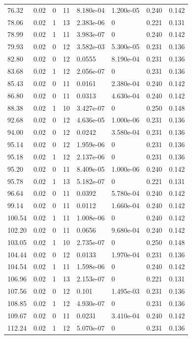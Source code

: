 \documentclass[preview]{standalone}
\begin{document}
{{{\begin{tabular}{L{1.2cm}C{1.2cm} C{0.3cm}C{0.5cm} C{1.4cm}C{1.4cm} C{1.4cm}C{1.4cm}}
  76.32  &  0.02  & 0     & 11 &  8.180e-04  & 1.200e-05  & 0.240 &  0.142   \\ 
  78.06  &  0.02  & 1     & 13 &  2.383e-06  & 0  & 0.221 &  0.131   \\ 
  78.99  &  0.02  & 1     & 11 &  3.983e-07  & 0  & 0.240 &  0.142   \\ 
  79.93  &  0.02  & 0     & 12 &  3.582e-03  & 5.300e-05  & 0.231 &  0.136   \\ 
  82.80  &  0.02  & 0     & 12 &  0.0555  & 8.190e-04  & 0.231 &  0.136   \\ 
  83.68  &  0.02  & 1     & 12 &  2.056e-07  & 0  & 0.231 &  0.136   \\ 
  85.43  &  0.02  & 0     & 11 &  0.0161  & 2.380e-04  & 0.240 &  0.142   \\ 
  86.80  &  0.02  & 0     & 11 &  0.0313  & 4.630e-04  & 0.240 &  0.142   \\ 
  88.38  &  0.02  & 1     & 10 &  3.427e-07  & 0  & 0.250 &  0.148   \\ 
  92.68  &  0.02  & 0     & 12 &  4.636e-05  & 1.000e-06  & 0.231 &  0.136   \\ 
  94.00  &  0.02  & 0     & 12 &  0.0242  & 3.580e-04  & 0.231 &  0.136   \\ 
  95.14  &  0.02  & 0     & 12 &  1.959e-06  & 0  & 0.231 &  0.136   \\ 
  95.18  &  0.02  & 1     & 12 &  2.137e-06  & 0  & 0.231 &  0.136   \\ 
  95.20  &  0.02  & 0     & 11 &  8.409e-05  & 1.000e-06  & 0.240 &  0.142   \\ 
  95.78  &  0.02  & 1     & 13 &  5.182e-07  & 0  & 0.221 &  0.131   \\ 
  96.64  &  0.02  & 0     & 11 &  0.0392  & 5.780e-04  & 0.240 &  0.142   \\ 
  99.14  &  0.02  & 0     & 11 &  0.0112  & 1.660e-04  & 0.240 &  0.142   \\ 
  100.54  &  0.02  & 1     & 11 &  1.008e-06  & 0  & 0.240 &  0.142   \\ 
  102.20  &  0.02  & 0     & 11 &  0.0656  & 9.680e-04  & 0.240 &  0.142   \\ 
  103.05  &  0.02  & 1     & 10 &  2.735e-07  & 0  & 0.250 &  0.148   \\ 
  104.44  &  0.02  & 0     & 12 &  0.0133  & 1.970e-04  & 0.231 &  0.136   \\ 
  104.54  &  0.02  & 1     & 11 &  1.598e-06  & 0  & 0.240 &  0.142   \\ 
  106.96  &  0.02  & 1     & 13 &  2.153e-07  & 0  & 0.221 &  0.131   \\ 
  107.56  &  0.02  & 0     & 12 &  0.101  & 1.495e-03  & 0.231 &  0.136   \\ 
  108.85  &  0.02  & 1     & 12 &  4.930e-07  & 0  & 0.231 &  0.136   \\ 
  109.67  &  0.02  & 0     & 11 &  0.0231  & 3.410e-04  & 0.240 &  0.142   \\ 
  112.24  &  0.02  & 1     & 12 &  5.070e-07  & 0  & 0.231 &  0.136   \\ 
\hline 
\end{tabular} 

}}}
\end{document}
